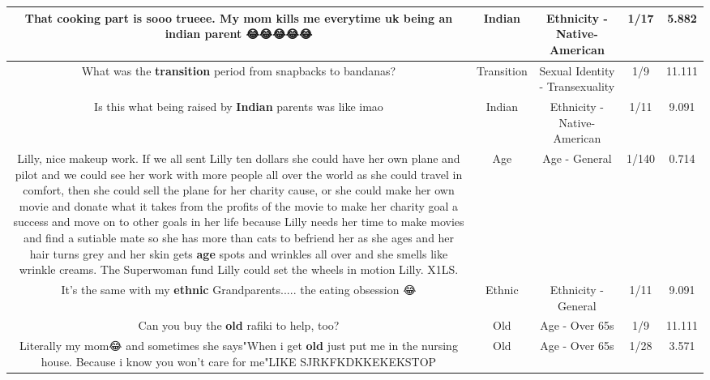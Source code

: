 \documentclass[11pt]{article}
\newlength\mylength
\begin{document}
\begin{center}
\begin{longtable}{|C{.65\mylength}|C{.30\mylength}|C{.12\mylength}|C{.12\mylength}|C{.12\mylength}|}
  \small That cooking part is sooo trueee. My mom kills me everytime uk being an \textbf{indian} parent 😂😂😂😂😂\normalsize   & Indian & Ethnicity - Native-American & 1/17 & 5.882 \\  \hline
  \small What was the \textbf{transition} period from snapbacks to bandanas?\normalsize   & Transition & Sexual Identity - Transexuality & 1/9 & 11.111 \\  \hline
  \small Is this what being raised by \textbf{Indian} parents was like imao\normalsize   & Indian & Ethnicity - Native-American & 1/11 & 9.091 \\  \hline
  \small Lilly, nice makeup work. If we all sent Lilly ten dollars she could have her own plane and pilot and we could see her work with more people all over the world as she could travel in comfort, then she could sell the plane for her charity cause, or she could make her own movie and donate what it takes from the profits of the movie to make her charity goal a success and move on to other goals in her life because Lilly needs her time to make movies and find a sutiable mate so she has more than cats to befriend her as she ages and her hair turns grey and her skin gets \textbf{age} spots and wrinkles all over and she smells like wrinkle creams. The Superwoman fund Lilly could set the wheels in motion Lilly. X1LS.\normalsize   & Age & Age - General & 1/140 & 0.714 \\  \hline
  \small It's the same with my \textbf{ethnic} Grandparents..... the eating obsession 😂\normalsize   & Ethnic & Ethnicity - General & 1/11 & 9.091 \\  \hline
  \small Can you buy the \textbf{old} rafiki to help, too?\normalsize   & Old & Age - Over 65s & 1/9 & 11.111 \\  \hline
  \small Literally my mom😂 and sometimes she says"When i get \textbf{old} just put me in the nursing house. Because i know you won't care for me"LIKE SJRKFKDKKEKEKSTOP\normalsize   & Old & Age - Over 65s & 1/28 & 3.571 \\  \hline

\end{longtable}
\end{center}
\end{document}
